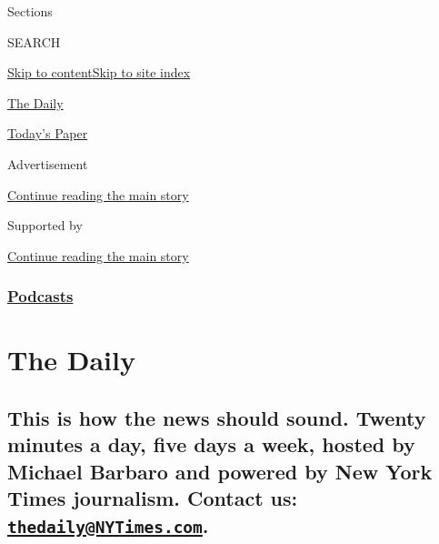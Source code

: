 Sections

SEARCH

\protect\hyperlink{site-content}{Skip to
content}\protect\hyperlink{site-index}{Skip to site index}

\href{https://www.nytimes3xbfgragh.onion/column/the-daily}{The Daily}

\href{https://myaccount.nytimes3xbfgragh.onion/auth/login?response_type=cookie\&client_id=vi}{}

\href{https://www.nytimes3xbfgragh.onion/section/todayspaper}{Today's
Paper}

Advertisement

\protect\hyperlink{after-top}{Continue reading the main story}

Supported by

\protect\hyperlink{after-sponsor}{Continue reading the main story}

\hypertarget{podcasts}{%
\subsubsection{\texorpdfstring{\href{/spotlight/podcasts}{Podcasts}}{Podcasts}}\label{podcasts}}

\hypertarget{the-daily}{%
\section{The Daily}\label{the-daily}}

\hypertarget{this-is-how-the-news-should-sound-twenty-minutes-a-day-five-days-a-week-hosted-by-michael-barbaro-and-powered-by-new-york-times-journalism-contact-us-thedailynytimescom}{%
\subsection{\texorpdfstring{This is how the news should sound. Twenty
minutes a day, five days a week, hosted by Michael Barbaro and powered
by New York Times journalism. Contact us:
\href{mailto:thedaily@NYTimes.com}{\nolinkurl{thedaily@NYTimes.com}}.}{This is how the news should sound. Twenty minutes a day, five days a week, hosted by Michael Barbaro and powered by New York Times journalism. Contact us: thedaily@NYTimes.com.}}\label{this-is-how-the-news-should-sound-twenty-minutes-a-day-five-days-a-week-hosted-by-michael-barbaro-and-powered-by-new-york-times-journalism-contact-us-thedailynytimescom}}

